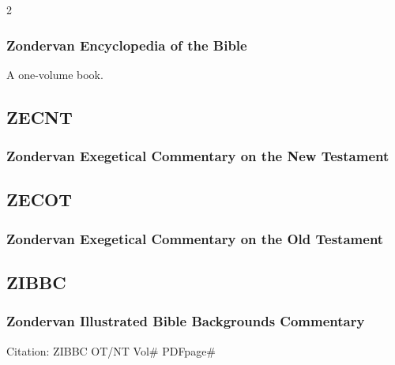 \begin{multicols}{2}
		\subsubsection*{Zondervan Encyclopedia of the Bible}
		
			A one-volume book.
			
	\subsection*{ZECNT}
	
		\subsubsection*{Zondervan Exegetical Commentary on the New Testament}
		
			\phantom{.}
			
	\subsection*{ZECOT}
	
		\subsubsection*{Zondervan Exegetical Commentary on the Old Testament}
		
			\phantom{.}
		
	\subsection*{ZIBBC}
	
		\subsubsection*{Zondervan Illustrated Bible Backgrounds Commentary}
		
			Citation:
				ZIBBC OT/NT Vol\# PDFpage\#
				

\end{multicols}
